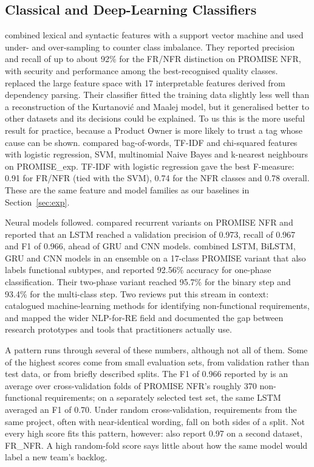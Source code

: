 \documentclass[conference,10pt,letterpaper]{IEEEtran}
\begin{document}
\subsection{Classical and Deep-Learning Classifiers}
\textcite{kurtanovic2017} combined lexical and syntactic features with a support vector machine and used under- and over-sampling to counter class imbalance. They reported precision and recall of up to about 92\% for the FR/NFR distinction on PROMISE NFR, with security and performance among the best-recognised quality classes. \textcite{dalpiaz2019} replaced the large feature space with 17 interpretable features derived from dependency parsing. Their classifier fitted the training data slightly less well than a reconstruction of the Kurtanović and Maalej model, but it generalised better to other datasets and its decisions could be explained. To us this is the more useful result for practice, because a Product Owner is more likely to trust a tag whose cause can be shown. \Textcite{diascanedo2020} compared bag-of-words, TF-IDF and chi-squared features with logistic regression, SVM, multinomial Naive Bayes and k-nearest neighbours on PROMISE\_exp. TF-IDF with logistic regression gave the best F-measure: 0.91 for FR/NFR (tied with the SVM), 0.74 for the NFR classes and 0.78 overall. These are the same feature and model families as our baselines in Section~\ref{sec:exp}.

Neural models followed. \textcite{rahman2019} compared recurrent variants on PROMISE NFR and reported that an LSTM reached a validation precision of 0.973, recall of 0.967 and F1 of 0.966, ahead of GRU and CNN models. \textcite{rahimi2021} combined LSTM, BiLSTM, GRU and CNN models in an ensemble on a 17-class PROMISE variant that also labels functional subtypes, and reported 92.56\% accuracy for one-phase classification. Their two-phase variant reached 95.7\% for the binary step and 93.4\% for the multi-class step. Two reviews put this stream in context: \textcite{binkhonain2019} catalogued machine-learning methods for identifying non-functional requirements, and \textcite{zhao2022nlp4re} mapped the wider NLP-for-RE field and documented the gap between research prototypes and tools that practitioners actually use.

A pattern runs through several of these numbers, although not all of them. Some of the highest scores come from small evaluation sets, from validation rather than test data, or from briefly described splits. The F1 of 0.966 reported by \textcite{rahman2019} is an average over cross-validation folds of PROMISE NFR's roughly 370 non-functional requirements; on a separately selected test set, the same LSTM averaged an F1 of 0.70. Under random cross-validation, requirements from the same project, often with near-identical wording, fall on both sides of a split. Not every high score fits this pattern, however: \textcite{eltahier2025} also report 0.97 on a second dataset, FR\_NFR. A high random-fold score says little about how the same model would label a new team's backlog.
\end{document}
